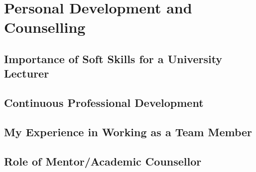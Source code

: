 \chapter{Personal Development and Counselling}
\section{Importance of Soft Skills for a University Lecturer}
\section{Continuous Professional Development}
\section{My Experience in Working as a Team Member}
\section{Role of Mentor/Academic Counsellor}